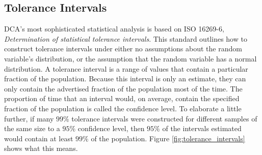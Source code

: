 \documentclass[11pt,a4paper,article]{memoir} %
\begin{document}
\newpage
\subsection*{Tolerance Intervals}
DCA's most sophisticated statistical analysis is based on ISO 16269-6, \emph{Determination of statistical tolerance intervals}. This standard outlines how to construct tolerance intervals under either no assumptions about the random variable's distribution, or the assumption that the random variable has a normal distribution. A tolerance interval is a range of values that contain a particular fraction of the population. Because this interval is only an estimate, they can only contain the advertised fraction of the population most of the time. The proportion of time that an interval would, on average, contain the specified fraction of the population is called the confidence level. To elaborate a little further, if many $99\%$ tolerance intervals were constructed for different samples of the same size to a $95\%$ confidence level, then $95\%$ of the intervals estimated would contain at least $99\%$ of the population. Figure \ref{fig:tolerance_intervals} shows what this means.
\end{document}
